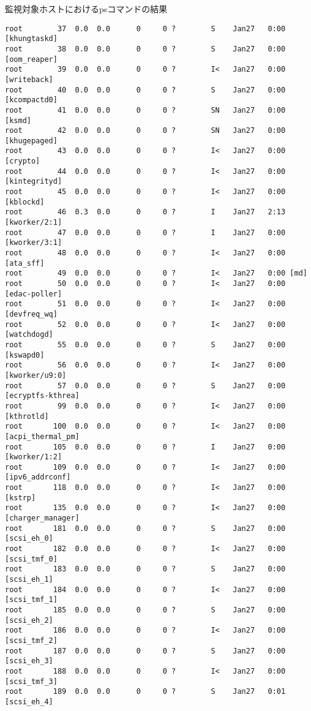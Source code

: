 \begin{itembox}[l]{監視対象ホストにおけるpsコマンドの結果}
\begin{verbatim}
root        37  0.0  0.0      0     0 ?        S    Jan27   0:00 [khungtaskd]
root        38  0.0  0.0      0     0 ?        S    Jan27   0:00 [oom_reaper]
root        39  0.0  0.0      0     0 ?        I<   Jan27   0:00 [writeback]
root        40  0.0  0.0      0     0 ?        S    Jan27   0:00 [kcompactd0]
root        41  0.0  0.0      0     0 ?        SN   Jan27   0:00 [ksmd]
root        42  0.0  0.0      0     0 ?        SN   Jan27   0:00 [khugepaged]
root        43  0.0  0.0      0     0 ?        I<   Jan27   0:00 [crypto]
root        44  0.0  0.0      0     0 ?        I<   Jan27   0:00 [kintegrityd]
root        45  0.0  0.0      0     0 ?        I<   Jan27   0:00 [kblockd]
root        46  0.3  0.0      0     0 ?        I    Jan27   2:13 [kworker/2:1]
root        47  0.0  0.0      0     0 ?        I    Jan27   0:00 [kworker/3:1]
root        48  0.0  0.0      0     0 ?        I<   Jan27   0:00 [ata_sff]
root        49  0.0  0.0      0     0 ?        I<   Jan27   0:00 [md]
root        50  0.0  0.0      0     0 ?        I<   Jan27   0:00 [edac-poller]
root        51  0.0  0.0      0     0 ?        I<   Jan27   0:00 [devfreq_wq]
root        52  0.0  0.0      0     0 ?        I<   Jan27   0:00 [watchdogd]
root        55  0.0  0.0      0     0 ?        S    Jan27   0:00 [kswapd0]
root        56  0.0  0.0      0     0 ?        I<   Jan27   0:00 [kworker/u9:0]
root        57  0.0  0.0      0     0 ?        S    Jan27   0:00 [ecryptfs-kthrea]
root        99  0.0  0.0      0     0 ?        I<   Jan27   0:00 [kthrotld]
root       100  0.0  0.0      0     0 ?        I<   Jan27   0:00 [acpi_thermal_pm]
root       105  0.0  0.0      0     0 ?        I    Jan27   0:00 [kworker/1:2]
root       109  0.0  0.0      0     0 ?        I<   Jan27   0:00 [ipv6_addrconf]
root       118  0.0  0.0      0     0 ?        I<   Jan27   0:00 [kstrp]
root       135  0.0  0.0      0     0 ?        I<   Jan27   0:00 [charger_manager]
root       181  0.0  0.0      0     0 ?        S    Jan27   0:00 [scsi_eh_0]
root       182  0.0  0.0      0     0 ?        I<   Jan27   0:00 [scsi_tmf_0]
root       183  0.0  0.0      0     0 ?        S    Jan27   0:00 [scsi_eh_1]
root       184  0.0  0.0      0     0 ?        I<   Jan27   0:00 [scsi_tmf_1]
root       185  0.0  0.0      0     0 ?        S    Jan27   0:00 [scsi_eh_2]
root       186  0.0  0.0      0     0 ?        I<   Jan27   0:00 [scsi_tmf_2]
root       187  0.0  0.0      0     0 ?        S    Jan27   0:00 [scsi_eh_3]
root       188  0.0  0.0      0     0 ?        I<   Jan27   0:00 [scsi_tmf_3]
root       189  0.0  0.0      0     0 ?        S    Jan27   0:01 [scsi_eh_4]

\end{verbatim}
\end{itembox}
